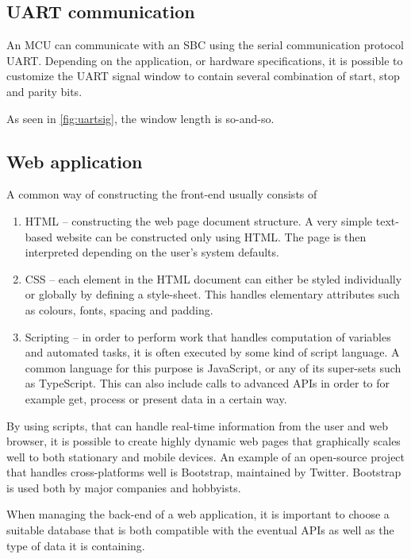 \subsection{UART communication}%
\label{sub:uart}
An MCU can communicate with an SBC using the serial communication protocol UART. Depending on the application, or hardware specifications, it is possible to customize the UART signal window to contain several combination of start, stop and parity bits.


As seen in \ref{fig:uartsig}, the window length is so-and-so.

\newpage

\subsection{Web application}%
\label{sub:web_application}
A common way of constructing the front-end usually consists of 
\begin{enumerate}
  \item HTML -- constructing the web page document structure. A very simple text-based website can be constructed only using HTML. The page is then interpreted depending on the user's system defaults.
  \item CSS -- each element in the HTML document can either be styled individually or globally by defining a style-sheet. This handles elementary attributes such as colours, fonts, spacing and padding.  
  \item Scripting -- in order to perform work that handles computation of variables and automated tasks, it is often executed by some kind of script language. A common language for this purpose is JavaScript, or any of its super-sets such as TypeScript. This can also include calls to advanced APIs in order to for example get, process or present data in a certain way.

\end{enumerate}
By using scripts, that can handle real-time information from the user and web browser, it is possible to create highly dynamic web pages that graphically scales well to both stationary and mobile devices.
An example of an open-source project that handles cross-platforms well is Bootstrap, maintained by Twitter. Bootstrap is used both by major companies and hobbyists.

When managing the back-end of a web application, it is important to choose a suitable database that is both compatible with the eventual APIs as well as the type of data it is containing. 

